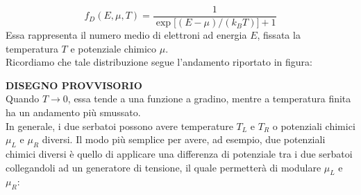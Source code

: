 \begin{equation}
    f_D(E,\mu,T)
    = \frac{1}{\exp \bigl[ (E - \mu)/(k_B T) \bigr] + 1}
    \label{eq:distribuzione_Fermi-Dirac}
\end{equation}
Essa rappresenta il numero medio di elettroni ad energia $E$, fissata la temperatura $T$ e potenziale chimico $\mu$.\\
Ricordiamo che tale distribuzione segue l'andamento riportato in figura:
\begin{figure}[H]
    \centering
\end{figure}
\textbf{DISEGNO PROVVISORIO}\\
Quando $T\to 0$, essa tende a una funzione a gradino, mentre a temperatura finita ha un andamento più smussato.\\
In generale, i due serbatoi possono avere temperature $T_L$ e $T_R$ o potenziali chimici $\mu_L$ e $\mu_R$ diversi. Il modo più semplice per avere, ad esempio, due potenziali chimici diversi è quello di applicare una differenza di potenziale tra i due serbatoi collegandoli ad un generatore di tensione, il quale permetterà di modulare $\mu_L$ e $\mu_R$:
